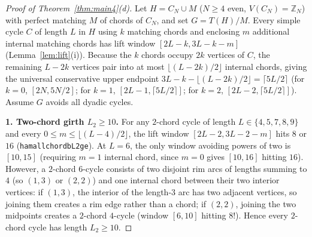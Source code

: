 \documentclass[11pt,reqno]{amsart}
\theoremstyle{plain}
\theoremstyle{definition}
\theoremstyle{remark}
\DeclareRobustCommand{\_}{\ifmmode\text{\textunderscore}\else\textunderscore\allowbreak\fi}
\begin{document}
\begin{proof}[Proof of Theorem~\ref{thm:main4}(d)]
Let $H = C_N \cup M$ ($N \ge 4$ even, $V(C_N) = \mathbb{Z}_N$) with perfect matching $M$ of chords of $C_N$, and set $G = T(H)/M$. Every simple cycle $C$ of length $L$ in $H$ using $k$ matching chords and enclosing $m$ additional internal matching chords has lift window $[2L - k, 3L - k - m]$ (Lemma~\ref{lem:lift}(i)). Because the $k$ chords occupy $2k$ vertices of $C$, the remaining $L - 2k$ vertices pair into at most $\lfloor (L - 2k)/2 \rfloor$ internal chords, giving the universal conservative upper endpoint $3L - k - \lfloor (L - 2k)/2 \rfloor = \lceil 5L/2 \rceil$ (for $k = 0$, $[2N, 5N/2]$; for $k = 1$, $[2L - 1, \lceil 5L/2 \rceil]$; for $k = 2$, $[2L - 2, \lceil 5L/2 \rceil]$). Assume $G$ avoids all dyadic cycles.

\medskip
\noindent\textbf{1. Two-chord girth $L_2 \ge 10$.}
For any $2$-chord cycle of length $L \in \{4, 5, 7, 8, 9\}$ and every $0 \le m \le \lfloor (L - 4)/2 \rfloor$, the lift window $[2L - 2, 3L - 2 - m]$ hits $8$ or $16$ (\texttt{ham\_all\_chord\_b\_L2\_ge\_10}). At $L = 6$, the only window avoiding powers of two is $[10, 15]$ (requiring $m = 1$ internal chord, since $m = 0$ gives $[10, 16]$ hitting $16$). However, a $2$-chord $6$-cycle consists of two disjoint rim arcs of lengths summing to $4$ (so $(1, 3)$ or $(2, 2)$) and one internal chord between their two interior vertices: if $(1, 3)$, the interior of the length-$3$ arc has two adjacent vertices, so joining them creates a rim edge rather than a chord; if $(2, 2)$, joining the two midpoints creates a $2$-chord $4$-cycle (window $[6, 10]$ hitting $8$!). Hence every $2$-chord cycle has length $L_2 \ge 10$.


\end{proof}
\end{document}

